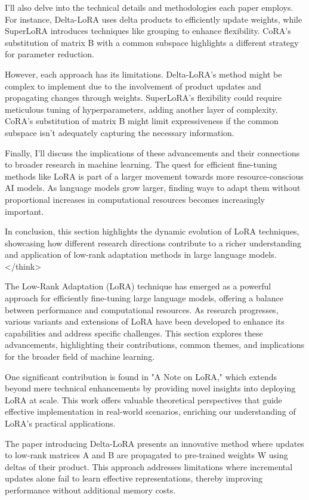 \documentclass[conference]{IEEEtran}
\begin{document}
I'll also delve into the technical details and methodologies each paper employs. For instance, Delta-LoRA uses delta products to efficiently update weights, while SuperLoRA introduces techniques like grouping to enhance flexibility. CoRA's substitution of matrix B with a common subspace highlights a different strategy for parameter reduction.

However, each approach has its limitations. Delta-LoRA's method might be complex to implement due to the involvement of product updates and propagating changes through weights. SuperLoRA's flexibility could require meticulous tuning of hyperparameters, adding another layer of complexity. CoRA's substitution of matrix B might limit expressiveness if the common subspace isn't adequately capturing the necessary information.

Finally, I'll discuss the implications of these advancements and their connections to broader research in machine learning. The quest for efficient fine-tuning methods like LoRA is part of a larger movement towards more resource-conscious AI models. As language models grow larger, finding ways to adapt them without proportional increases in computational resources becomes increasingly important.

In conclusion, this section highlights the dynamic evolution of LoRA techniques, showcasing how different research directions contribute to a richer understanding and application of low-rank adaptation methods in large language models.
</think>

The Low-Rank Adaptation (LoRA) technique has emerged as a powerful approach for efficiently fine-tuning large language models, offering a balance between performance and computational resources. As research progresses, various variants and extensions of LoRA have been developed to enhance its capabilities and address specific challenges. This section explores these advancements, highlighting their contributions, common themes, and implications for the broader field of machine learning.

One significant contribution is found in "A Note on LoRA," which extends beyond mere technical enhancements by providing novel insights into deploying LoRA at scale. This work offers valuable theoretical perspectives that guide effective implementation in real-world scenarios, enriching our understanding of LoRA's practical applications.

The paper introducing Delta-LoRA presents an innovative method where updates to low-rank matrices A and B are propagated to pre-trained weights W using deltas of their product. This approach addresses limitations where incremental updates alone fail to learn effective representations, thereby improving performance without additional memory costs.
\end{document}
